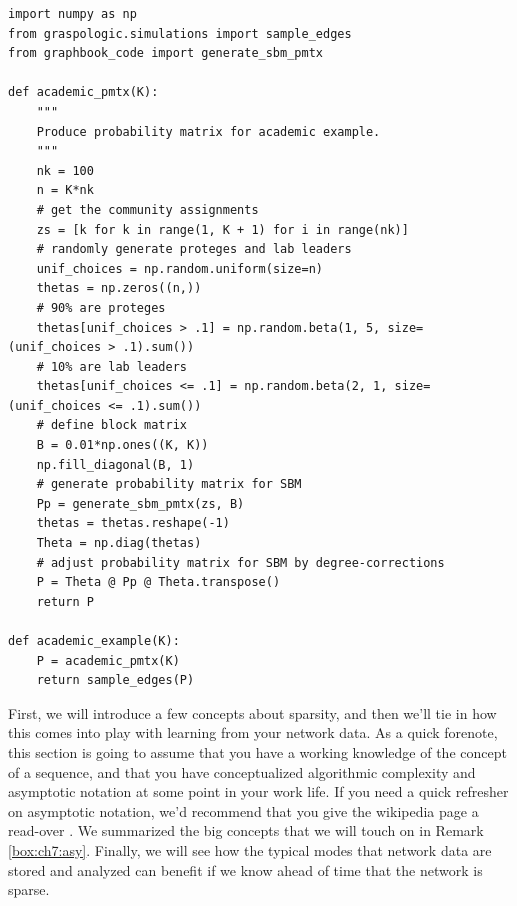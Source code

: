 \begin{lstlisting}[style=python]
import numpy as np
from graspologic.simulations import sample_edges
from graphbook_code import generate_sbm_pmtx
    
def academic_pmtx(K):
    """
    Produce probability matrix for academic example.
    """
    nk = 100
    n = K*nk
    # get the community assignments
    zs = [k for k in range(1, K + 1) for i in range(nk)]
    # randomly generate proteges and lab leaders
    unif_choices = np.random.uniform(size=n)
    thetas = np.zeros((n,))
    # 90% are proteges
    thetas[unif_choices > .1] = np.random.beta(1, 5, size=(unif_choices > .1).sum())
    # 10% are lab leaders
    thetas[unif_choices <= .1] = np.random.beta(2, 1, size=(unif_choices <= .1).sum())
    # define block matrix
    B = 0.01*np.ones((K, K))
    np.fill_diagonal(B, 1)
    # generate probability matrix for SBM
    Pp = generate_sbm_pmtx(zs, B)
    thetas = thetas.reshape(-1)
    Theta = np.diag(thetas)
    # adjust probability matrix for SBM by degree-corrections
    P = Theta @ Pp @ Theta.transpose()
    return P

def academic_example(K):
    P = academic_pmtx(K)
    return sample_edges(P)
\end{lstlisting}

First, we will introduce a few concepts about sparsity, and then we’ll tie in how this comes into play with learning from your network data. As a quick forenote, this section is going to assume that you have a working knowledge of the concept of a sequence, and that you have conceptualized algorithmic complexity and asymptotic notation at some point in your work life. If you need a quick refresher on asymptotic notation, we'd recommend that you give the wikipedia page a read-over \cite{bigonotation}. We summarized the big concepts that we will touch on in Remark \ref{box:ch7:asy}. Finally, we will see how the typical modes that network data are stored and analyzed can benefit if we know ahead of time that the network is sparse.


